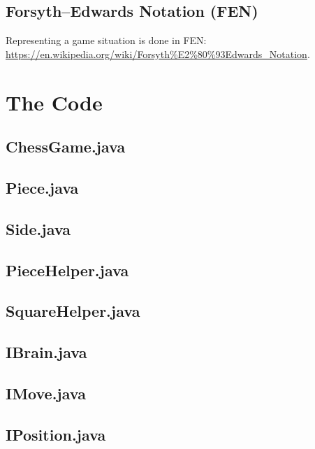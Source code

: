 \documentclass [12pt ,a4paper, english]{scrartcl}
\theoremstyle{plain}
\theoremstyle{definition}
\theoremstyle{remark}
\begin{document}
\subsection{Forsyth–Edwards Notation (FEN)}
Representing a game situation is done in FEN: \url{https://en.wikipedia.org/wiki/Forsyth%E2%80%93Edwards_Notation}.


\section{The Code}

\subsection{ChessGame.java}
\label{sec:chessgame}


\subsection{Piece.java}


\subsection{Side.java}


\subsection{PieceHelper.java}


\subsection{SquareHelper.java}


\subsection{IBrain.java}
\label{sec:ibrain}


\subsection{IMove.java}


\subsection{IPosition.java}

\end{document}
